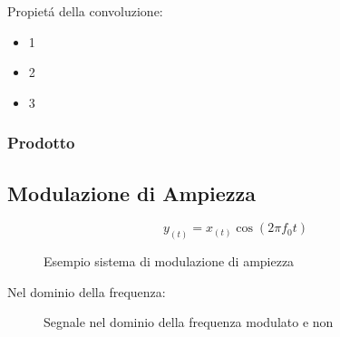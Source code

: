             Propietá della convoluzione:
            \begin{itemize}
                \item {1}
                \item {2}
                \item {3}
            \end{itemize}
        \subsubsection{Prodotto}\label{Prodotto}


    \subsection{Modulazione di Ampiezza}\label{Modulazione di Ampiezza}
        \[
            y_{(t)} = x_{(t)}\cos(2\pi f_0t)
        \]
        \begin{figure}[H]
            \centering
            \hfill
            \caption{Esempio sistema di modulazione di ampiezza}
        \end{figure}
        Nel dominio della frequenza:
        \begin{figure}[H]
            \centering
            \hfill
            \caption{Segnale nel dominio della frequenza modulato e non}
        \end{figure}

